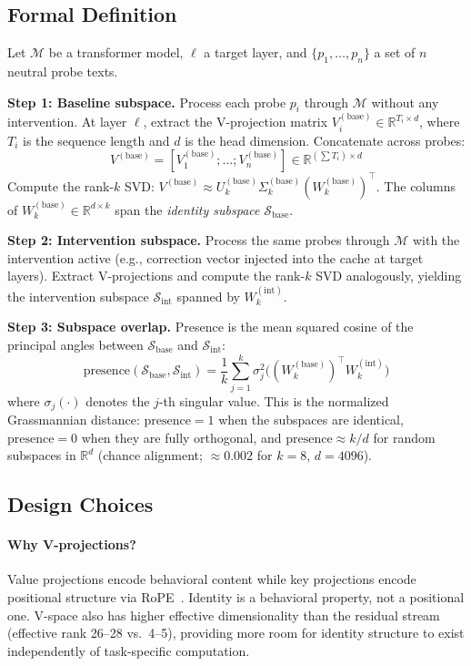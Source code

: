 \documentclass[11pt,a4paper]{article}
\begin{document}
\subsection{Formal Definition}

Let $\mathcal{M}$ be a transformer model, $\ell$ a target layer, and
$\{p_1, \ldots, p_n\}$ a set of $n$ neutral probe texts.

\textbf{Step 1: Baseline subspace.} Process each probe $p_i$ through
$\mathcal{M}$ without any intervention. At layer $\ell$, extract the
V-projection matrix $V_i^{(\text{base})} \in \mathbb{R}^{T_i \times d}$,
where $T_i$ is the sequence length and $d$ is the head dimension. Concatenate
across probes:
\[
V^{(\text{base})} = [V_1^{(\text{base})}; \ldots; V_n^{(\text{base})}]
  \in \mathbb{R}^{(\sum T_i) \times d}
\]
Compute the rank-$k$ SVD: $V^{(\text{base})} \approx U_k^{(\text{base})}
\Sigma_k^{(\text{base})} (W_k^{(\text{base})})^\top$. The columns of
$W_k^{(\text{base})} \in \mathbb{R}^{d \times k}$ span the
\emph{identity subspace} $\mathcal{S}_{\text{base}}$.

\textbf{Step 2: Intervention subspace.} Process the same probes through
$\mathcal{M}$ with the intervention active (e.g., correction vector injected
into the cache at target layers). Extract V-projections and compute the
rank-$k$ SVD analogously, yielding the intervention subspace
$\mathcal{S}_{\text{int}}$ spanned by $W_k^{(\text{int})}$.

\textbf{Step 3: Subspace overlap.} Presence is the mean squared cosine of the
principal angles between $\mathcal{S}_{\text{base}}$ and
$\mathcal{S}_{\text{int}}$:
\begin{equation}
\text{presence}(\mathcal{S}_{\text{base}}, \mathcal{S}_{\text{int}})
  = \frac{1}{k} \sum_{j=1}^{k} \sigma_j^2
    \bigl( (W_k^{(\text{base})})^\top W_k^{(\text{int})} \bigr)
\label{eq:presence}
\end{equation}
where $\sigma_j(\cdot)$ denotes the $j$-th singular value. This is the
normalized Grassmannian distance: $\text{presence} = 1$ when the subspaces
are identical, $\text{presence} = 0$ when they are fully orthogonal, and
$\text{presence} \approx k/d$ for random subspaces in $\mathbb{R}^d$
(chance alignment; $\approx 0.002$ for $k{=}8$, $d{=}4096$).

\subsection{Design Choices}

\paragraph{Why V-projections?}
Value projections encode behavioral content while key projections encode
positional structure via RoPE~\citep{pustovit2026knowledge}. Identity is a
behavioral property, not a positional one. V-space also has higher effective
dimensionality than the residual stream (effective rank 26--28 vs.\ 4--5),
providing more room for identity structure to exist independently of
task-specific computation.
\end{document}
